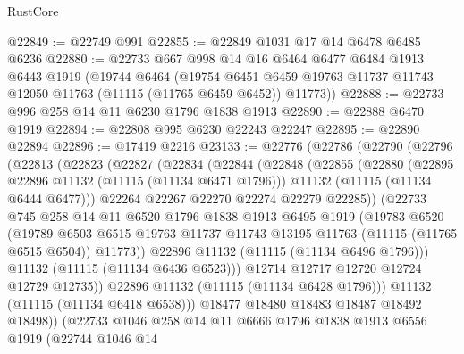 \begin{lexlean}{RustCore}
\begin{coremodule}
@22849 := @22749 @991
@22855 := @22849 @1031 @17 @14 @6478 @6485 @6236
@22880 := @22733
    @667
    @998
    @14
    @16
    @6464
    @6477
    @6484
    @1913
    @6443
    @1919
    (@19744
      @6464
      (@19754 @6451 @6459 @19763 @11737 @11743 @12050 @11763 (@11115 (@11765 @6459 @6452)) @11773))
@22888 := @22733 @996 @258 @14 @11 @6230 @1796 @1838 @1913
@22890 := @22888 @6470 @1919
@22894 := @22808 @995 @6230 @22243 @22247
@22895 := @22890 @22894
@22896 := @17419 @2216
@23133 := @22776
    (@22786
      (@22790
        (@22796
          (@22813
            (@22823
              (@22827
                (@22834
                  (@22844
                    (@22848
                      (@22855
                        (@22880
                          (@22895 @22896 @11132 (@11115 (@11134 @6471 @1796)))
                          @11132
                          (@11115 (@11134 @6444 @6477)))
                        @22264
                        @22267
                        @22270
                        @22274
                        @22279
                        @22285))
                    (@22733
                      @745
                      @258
                      @14
                      @11
                      @6520
                      @1796
                      @1838
                      @1913
                      @6495
                      @1919
                      (@19783
                        @6520
                        (@19789
                          @6503
                          @6515
                          @19763
                          @11737
                          @11743
                          @13195
                          @11763
                          (@11115 (@11765 @6515 @6504))
                          @11773))
                      @22896
                      @11132
                      (@11115 (@11134 @6496 @1796)))
                    @11132
                    (@11115 (@11134 @6436 @6523)))
                  @12714
                  @12717
                  @12720
                  @12724
                  @12729
                  @12735))
              @22896
              @11132
              (@11115 (@11134 @6428 @1796)))
            @11132
            (@11115 (@11134 @6418 @6538)))
          @18477
          @18480
          @18483
          @18487
          @18492
          @18498))
      (@22733
        @1046
        @258
        @14
        @11
        @6666
        @1796
        @1838
        @1913
        @6556
        @1919
        (@22744
          @1046
          @14

\end{coremodule}
\end{lexlean}
